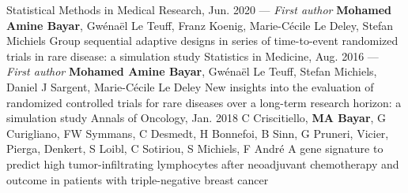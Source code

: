 \vspace*{.2em}
\begin{projects}
\paper
{Statistical Methods in Medical Research, Jun. 2020 --- \textit{First author}}
{}
{\textbf{Mohamed Amine Bayar}, Gw\'{e}na\"{e}l Le Teuff, Franz Koenig, Marie-C\'{e}cile Le Deley, Stefan Michiels}
{Group sequential adaptive designs in series of time-to-event randomized trials in rare disease: a simulation study}
\paper
{Statistics in Medicine, Aug. 2016 --- \textit{First author}}
{}
{\textbf{Mohamed Amine Bayar}, Gw\'{e}na\"{e}l Le Teuff, Stefan Michiels, Daniel J Sargent, Marie-C\'{e}cile Le Deley}
{New insights into the evaluation of randomized controlled trials for rare diseases over a long-term research horizon: a simulation study}
\paper
{Annals of Oncology, Jan. 2018}
{}
{C Criscitiello, \textbf{MA Bayar}, G Curigliano, FW Symmans, C Desmedt, H Bonnefoi, B Sinn, G Pruneri, Vicier, Pierga, Denkert, S Loibl, C Sotiriou, S Michiels, F André}
{A gene signature to predict high tumor-infiltrating lymphocytes after neoadjuvant chemotherapy and outcome in patients with triple-negative breast cancer}

\end{projects}
